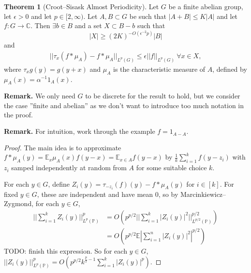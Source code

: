 \documentclass{article}
\theoremstyle{definition}
\newtheorem{theorem}{Theorem}[section]
\begin{document}
\begin{theorem}[Croot--Sisask Almost Periodicity]\label{Theorem3.8}
    Let $G$ be a finite abelian group, let $\epsilon>0$ and let $p \in [2,\infty)$. Let $A,B \subset G$ be such that $\left|A+B\right|\le K\left|A\right|$ and let $f: G \to \mathbb{C}$. Then $\exists b \in B$ and a set $X \subset B-b$ such that $$\left|X\right|\ge (2K)^{-O(\epsilon^{-2}p)} \left|B\right|$$ and 
    \begin{align*}
        ||\tau_x (f * \mu_A) - f * \mu_A||_{L^p(G)} \le \epsilon ||f||_{L^p(G)} ~\forall x \in X,
    \end{align*}
    where $\tau_x g(y) = g(y+x)$ and $\mu_A$ is the characteristic measure of $A$, defined by $\mu_A(x) = \alpha^{-1} 1_A(x)$.
\end{theorem}
\textbf{Remark.} We only need $G$ to be discrete for the result to hold, but we consider the case ''finite and abelian'' as we don't want to introduce too much notation in the proof.
\vspace{1mm}
 
\textbf{Remark.} For intuition, work through the example $f = 1_{A-A}$.

\begin{proof}
    The main idea is to approximate $f * \mu_A(y) = \mathbb{E}_{x}\mu_A(x)f(y-x) =  \mathbb{E}_{x \in A}f(y-x)$ by $\frac{1}{k}\sum_{i=1}^{k} f(y-z_i)$ with $z_i$ samped independently at random from $A$ for some suitable choice $k$. 
    \vspace{1mm}
     
    For each $y \in G$, define $Z_i(y) = \tau_{-z_i}(f)(y) - f * \mu_A(y)$ for $i \in [k]$. For fixed $y \in G$, these are independent and have mean 0, so by Marcinkiewicz--Zygmond, for each $y \in G$,
    \begin{align*}
        ||\sum_{i=1}^{k} Z_i(y)||_{L^p(\mathbb{P})}^p &= O \left(p^{p/2}||\sum_{i=1}^{k} \left|Z_i(y)\right|^2||_{L^{p/2}(\mathbb{P})}^{p/2} \right) \\
        &= O \left(p^{p/2} \mathbb{E}\left|\sum_{i=1}^{n} \left|Z_i(y)\right|^2 \right|^{p/2} \right)
    \end{align*}
    TODO: finish this expression. So for each $y \in G$, $||Z_i(y)||_{L^p(\mathbb{P})}^p = O \left(p^{p/2} k^{\frac{p}{2}-1} \sum_{i=1}^{k} \left|Z_i(y)\right|^p\right)$.
\end{proof}
\end{document}
